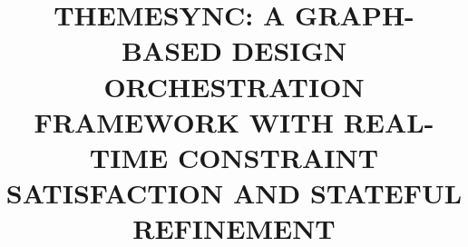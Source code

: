\documentclass[12pt]{cspcccsthesis}
\title{
THEMESYNC: A GRAPH-BASED DESIGN ORCHESTRATION FRAMEWORK WITH REAL-TIME CONSTRAINT SATISFACTION AND STATEFUL REFINEMENT 
}
\begin{document}

\begin{frontmatter}
\end{frontmatter}

\begin{thesisbody}
    
    
    
    
    
    
\end{thesisbody}
\end{document}
